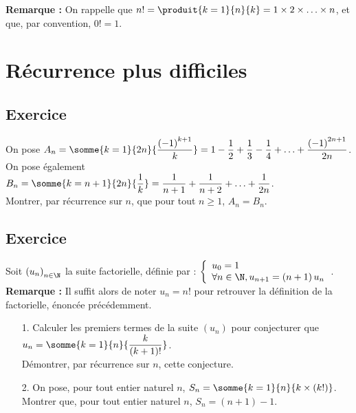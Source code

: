 \textbf{Remarque :} On rappelle que $n! = \produit{k=1}{n}{k} = 1 \times 2 \times \ldots \times n$, et que, par convention, $0! = 1$. 

\section{Récurrence plus difficiles}

\subsection{Exercice }

On pose $A_n = \somme{k=1}{2n}{\dfrac{\left(-1\right)^{k+1}}{k}} = 1 - \dfrac{1}{2} + \dfrac{1}{3} - \dfrac{1}{4} + \ldots + \dfrac{\left(-1\right)^{2n+1}}{2n}$. \\
On pose également $B_n = \somme{k=n+1}{2n}{\dfrac{1}{k}} = \dfrac{1}{n+1} + \dfrac{1}{n+2} + \ldots + \dfrac{1}{2n}$. \\

Montrer, par récurrence sur $n$, que pour tout $n \geqslant 1$, $A_n = B_n$.

\subsection{Exercice }

Soit $\left(u_n\right)_{n \in \N}$ la suite factorielle, définie par : $\left\{
  \begin{array}{l}
    u_0 = 1 \\
    \forall n \in \N, u_{n+1} = \left(n+1\right)u_n
  \end{array}
\right.$. \\

\textbf{Remarque :} Il suffit alors de noter $u_n = n!$ pour retrouver la définition de la factorielle, énoncée précédemment. \\

\begin{itemize}
\item[1.] Calculer les premiers termes de la suite $\left(u_n\right)$ pour conjecturer que $u_n = \somme{k=1}{n}{\dfrac{k}{\left(k+1\right)!}}$. \\

Démontrer, par récurrence sur $n$, cette conjecture. \\

\item[2.] On pose, pour tout entier naturel $n$, $S_n = \somme{k=1}{n}{k \times \left(k!\right)}$. \\

Montrer que, pour tout entier naturel $n$, $S_n = \left(n+1\right) - 1$.  
\end{itemize} 

